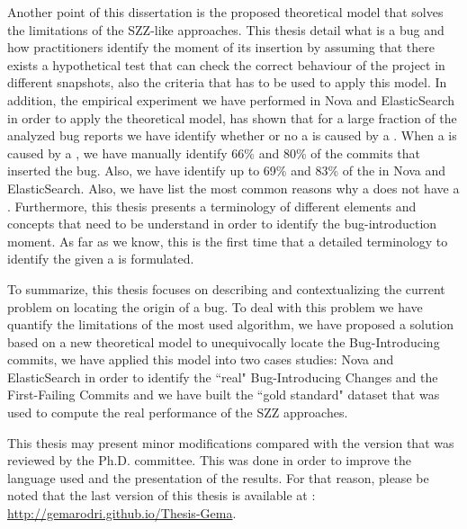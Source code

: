 \documentclass[a4paper, 12pt]{book}
\begin{document}
Another point of this dissertation is the proposed theoretical model that solves the limitations of the SZZ-like approaches. This thesis detail what is a bug and how practitioners identify the moment of its insertion by assuming that there exists a hypothetical test that can check the correct behaviour of the project in different snapshots, also the criteria that has to be used to apply this model. In addition, the empirical experiment we have performed in Nova and ElasticSearch in order to apply the theoretical model, has shown that for a large fraction of the analyzed bug reports we have identify whether or no a \BFC is caused by a \BIC. When a \BFC is caused by a \BIC, we have manually identify 66\% and 80\% of the commits that inserted the bug. Also, we have identify up to 69\% and 83\% of the \FFC in Nova and ElasticSearch.
Also, we have list the most common reasons why a \BFC does not have a \BIC. Furthermore, this thesis presents a terminology of different elements and concepts that need to be understand in order to identify the bug-introduction moment. As far as we know, this is the first time that a detailed terminology to identify the \BIC given a \BFC is formulated.

To summarize, this thesis focuses on describing and contextualizing the current problem on locating the origin of a bug. To deal with this problem we have quantify the limitations of the most used algorithm, we have proposed a solution based on a new theoretical model to unequivocally locate the Bug-Introducing commits, we have applied this model into two cases studies: Nova and ElasticSearch in order to identify the ``real" Bug-Introducing Changes and the First-Failing Commits and we have built the ``gold standard" dataset that was used to compute the real performance of the SZZ approaches.  



This thesis may present minor modifications compared with the version that was reviewed by the Ph.D. committee. This was done in order to improve the language used and the presentation of the results. For that reason, please be noted that the last version of this thesis is available at : \url{http://gemarodri.github.io/Thesis-Gema}. 
\end{document}
